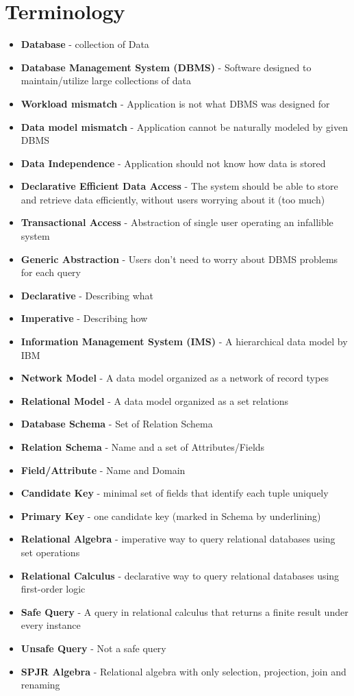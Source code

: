 \section{Terminology}
\begin{itemize}
\item \textbf{Database} - collection of Data
\item \textbf{Database Management System (DBMS)} - Software designed to maintain/utilize large collections of data
\item \textbf{Workload mismatch} - Application is not what DBMS was designed for
\item \textbf{Data model mismatch} - Application cannot be naturally modeled by given DBMS
\item \textbf{Data Independence} - Application should not know how data is stored
\item \textbf{Declarative Efficient Data Access} - The system should be able to store and retrieve data efficiently, without users worrying about it (too much)
\item \textbf{Transactional Access} - Abstraction of single user operating an infallible system
\item \textbf{Generic Abstraction} - Users don't need to worry about DBMS problems for each query
\item \textbf{Declarative} - Describing what
\item \textbf{Imperative} - Describing how
\item \textbf{Information Management System (IMS)} - A hierarchical data model by IBM
\item \textbf{Network Model} - A data model organized as a network of record types
\item \textbf{Relational Model} - A data model organized as a set relations
\item \textbf{Database Schema} - Set of Relation Schema
\item \textbf{Relation Schema} - Name and a set of Attributes/Fields
\item \textbf{Field/Attribute} - Name and Domain
\item \textbf{Candidate Key} - minimal set of fields that identify each tuple uniquely
\item \textbf{Primary Key} - one candidate key (marked in Schema by underlining)
\item \textbf{Relational Algebra} - imperative way to query relational databases using set operations
\item \textbf{Relational Calculus} - declarative way to query relational databases using first-order logic
\item \textbf{Safe Query} - A query in relational calculus that returns a finite result under every instance
\item \textbf{Unsafe Query} - Not a safe query
\item \textbf{SPJR Algebra} - Relational algebra with only selection, projection, join and renaming
\end{itemize}
\newpage

